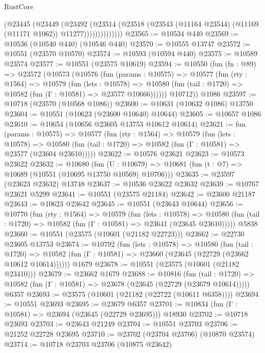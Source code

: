 \begin{lexlean}{RustCore}
\begin{coremodule}
                    (@23445
                      (@23449
                        (@23492
                          (@23514
                            (@23518
                              (@23543 (@11164 @23544) (@11169 (@11171 @1062)) @11277))))))))))))))
@23565 := @10534 @440
@23569 := @10536 (@10540 @440) (@10546 @440)
@23570 := @10555 @13747
@23572 := @10551 (@23570 @10570)
@23574 := @10593 (@10594 @440)
@23575 := @10589 @23574
@23577 := @10551 (@23575 @10619)
@23594 := @10550
    (fun (fn : @89) =>
    @23572
      (@10573
        (@10576
          (fun (params : @10575) =>
          @10577
            (fun (rty : @1564) =>
            @10579
              (fun (lets : @10578) =>
              @10580 (fun (tail : @1720) => @10582 (fun (Γ : @10581) => @23577 @10666))))))
        @10712))
    @1086
@23597 := @10718 (@23570 (@10568 @1086))
@23600 := @10631 (@10632 @1086) @13750
@23604 := @10551 (@10623 (@23600 @10640) @10644)
@23605 := @10657 @1086
@23610 := @10654 (@10656 @23605 @13753 @10612 @10614)
@23621 := fun (params : @10575) =>
  @10577
    (fun (rty : @1564) =>
    @10579
      (fun (lets : @10578) =>
      @10580 (fun (tail : @1720) => @10582 (fun (Γ : @10581) => @23577 (@23604 @23610)))))
@23622 := @10576 @23621
@23623 := @10573 @23622
@23632 := @10680
    (fun (U : @10679) => @10681 (fun (t : @7) => @10689 (@10551 (@10695 @13750 @10569) @10706)))
@23635 := @23597 (@23623 @23632) @13748
@23637 := @10536 @23622 @23632
@23639 := @10767 @23621 @5299
@23641 := @10551 (@23575 @21184)
@23642 := @23600 @21187
@23643 := @10623 @23642
@23645 := @10551 (@23643 @10644)
@23656 := @10770
    (fun (rty : @1564) =>
    @10579
      (fun (lets : @10578) =>
      @10580 (fun (tail : @1720) => @10582 (fun (Γ : @10581) => @23641 (@23645 @23610)))))
    @5838
@23660 := @10551 (@23575 (@10601 (@21182 @22723)))
@23662 := @22730 @23605 @13753
@23674 := @10792
    (fun (lets : @10578) =>
    @10580
      (fun (tail : @1720) =>
      @10582 (fun (Γ : @10581) => @23660 (@23645 (@22729 (@23662 @10612 @10614))))))
    @1679
@23678 := @10551 (@23575 (@10601 (@21182 @23410)))
@23679 := @23662 @1679
@23688 := @10816
    (fun (tail : @1720) => @10582 (fun (Γ : @10581) => @23678 (@23645 (@22729 (@23679 @10614)))))
    @6357
@23693 := @23575 (@10601 (@21182 (@22722 (@10611 @6358))))
@23694 := @10551 @23693
@23695 := @23679 @6357
@23701 := @10834 (fun (Γ : @10581) => @23694 (@23645 (@22729 @23695))) @18930
@23702 := @10718 @23693
@23703 := @23643 @21249
@23704 := @10551 @23703
@23706 := @21252 @22728 @23695
@23710 := @23702 (@23704 @23706) (@10870 @23574)
@23714 := @10718 @23703 @23706 (@10875 @23642)

\end{coremodule}
\end{lexlean}
